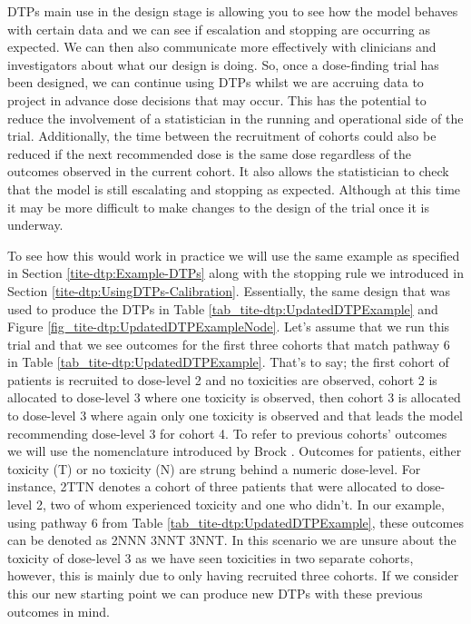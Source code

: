 DTPs main use in the design stage is allowing you to see how the model behaves with certain data and we can see if escalation and stopping are occurring as expected. We can then also communicate more effectively with clinicians and investigators about what our design is doing. So, once a dose-finding trial has been designed, we can continue using DTPs whilst we are accruing data to project in advance dose decisions that may occur. This has the potential to reduce the involvement of a statistician in the running and operational side of the trial. Additionally, the time between the recruitment of cohorts could also be reduced if the next recommended dose is the same dose regardless of the outcomes observed in the current cohort. It also allows the statistician to check that the model is still escalating and stopping as expected. Although at this time it may be more difficult to make changes to the design of the trial once it is underway. 

To see how this would work in practice we will use the same example as specified in Section \ref{tite-dtp:Example-DTPs} along with the stopping rule we introduced in Section \ref{tite-dtp:UsingDTPs-Calibration}. Essentially, the same design that was used to produce the DTPs in Table \ref{tab_tite-dtp:UpdatedDTPExample} and Figure \ref{fig_tite-dtp:UpdatedDTPExampleNode}. Let's assume that we run this trial and that we see outcomes for the first three cohorts that match pathway 6 in Table \ref{tab_tite-dtp:UpdatedDTPExample}. That's to say; the first cohort of patients is recruited to dose-level 2 and no toxicities are observed, cohort 2 is allocated to dose-level 3 where one toxicity is observed, then cohort 3 is allocated to dose-level 3 where again only one toxicity is observed and that leads the model recommending dose-level 3 for cohort 4. To refer to previous cohorts' outcomes we will use the nomenclature introduced by Brock \cite{brockImplementingEffToxDosefinding2017}. Outcomes for patients, either toxicity (T) or no toxicity (N) are strung behind a numeric dose-level. For instance, 2TTN denotes a cohort of three patients that were allocated to dose-level 2, two of whom experienced toxicity and one who didn't. In our example, using pathway 6 from Table \ref{tab_tite-dtp:UpdatedDTPExample}, these outcomes can be denoted as 2NNN 3NNT 3NNT. In this scenario we are unsure about the toxicity of dose-level 3 as we have seen toxicities in two separate cohorts, however, this is mainly due to only having recruited three cohorts. If we consider this our new starting point we can produce new DTPs with these previous outcomes in mind. 


